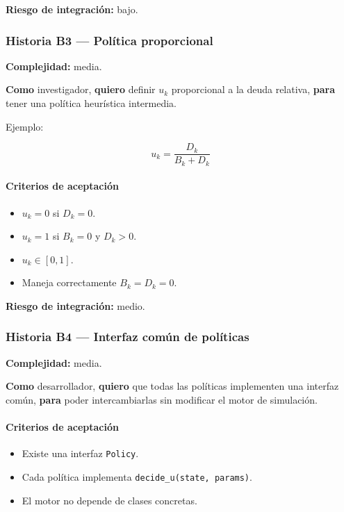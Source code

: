 \documentclass[11pt,a4paper]{article}
\begin{document}
\textbf{Riesgo de integraci\'on:} bajo.

\subsubsection{Historia B3 --- Pol\'itica proporcional}

\textbf{Complejidad:} media.

\textbf{Como} investigador, \textbf{quiero} definir $u_k$ proporcional a la deuda relativa, \textbf{para} tener una pol\'itica heur\'istica intermedia.

Ejemplo:

\begin{equation}
u_k = \frac{D_k}{B_k+D_k}
\end{equation}

\paragraph{Criterios de aceptaci\'on}

\begin{itemize}[leftmargin=*]
    \item $u_k=0$ si $D_k=0$.
    \item $u_k=1$ si $B_k=0$ y $D_k>0$.
    \item $u_k\in[0,1]$.
    \item Maneja correctamente $B_k=D_k=0$.
\end{itemize}

\textbf{Riesgo de integraci\'on:} medio.

\subsubsection{Historia B4 --- Interfaz com\'un de pol\'iticas}

\textbf{Complejidad:} media.

\textbf{Como} desarrollador, \textbf{quiero} que todas las pol\'iticas implementen una interfaz com\'un, \textbf{para} poder intercambiarlas sin modificar el motor de simulaci\'on.

\paragraph{Criterios de aceptaci\'on}

\begin{itemize}[leftmargin=*]
    \item Existe una interfaz \texttt{Policy}.
    \item Cada pol\'itica implementa \texttt{decide\_u(state, params)}.
    \item El motor no depende de clases concretas.
\end{itemize}
\end{document}
